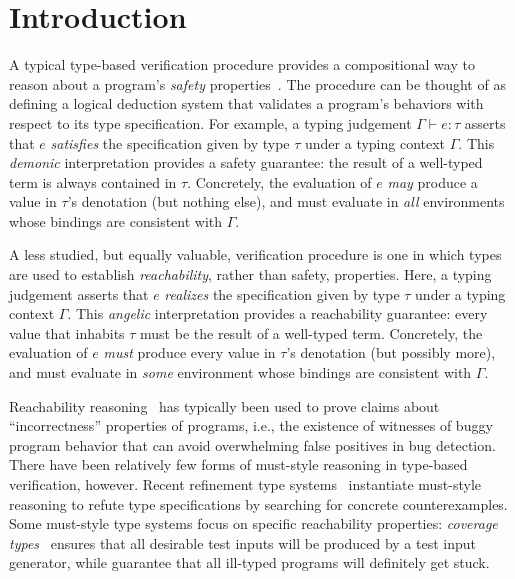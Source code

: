 \section{Introduction}\label{sec:intro}

A typical type-based verification procedure provides a compositional
way to reason about a program's \emph{safety} properties~\cite{...}.
The procedure can be thought of as defining a logical deduction system
that validates a program's behaviors with respect to its type
specification.  For example, a typing judgement $\Gamma \vdash e :
\tau$ asserts that $e$ \emph{satisfies} the specification given by type
$\tau$ under a typing context $\Gamma$.  This \emph{demonic}
interpretation provides a safety guarantee: the result of a well-typed
term is always contained in $\tau$.  Concretely, the evaluation of $e$
\emph{may} produce a value in $\tau$'s denotation (but nothing else),
and must evaluate in \emph{all} environments whose bindings are
consistent with $\Gamma$.

A less studied, but equally valuable, verification procedure is one in
which types are used to establish \emph{reachability}, rather than
safety, properties.  Here, a typing judgement asserts that $e$
\emph{realizes} the specification given by type $\tau$ under a typing
context $\Gamma$.  This \emph{angelic} interpretation provides a
reachability guarantee: every value that inhabits $\tau$ must be the
result of a well-typed term.  Concretely, the evaluation of $e$
\emph{must} produce every value in $\tau$'s denotation (but possibly
more), and must evaluate in \emph{some} environment whose bindings are
consistent with $\Gamma$.

Reachability reasoning~\cite{ReverseHoareLogic, OHP19, ZDS23} has
typically been used to prove claims about ``incorrectness'' properties
of programs, i.e., the existence of witnesses of buggy program
behavior that can avoid overwhelming false positives in bug
detection. There have been relatively few forms of must-style
reasoning in type-based verification, however. Recent refinement type
systems~\cite{RefinementTypeSymbolicExecution,RefinementTypeRefutations}
instantiate must-style reasoning to refute type specifications by
searching for concrete counterexamples.  Some must-style type systems
focus on specific reachability properties: \emph{coverage
  types}~\cite{CoverageType} ensures that all desirable test inputs
will be produced by a test input generator, while \citet{Ill-types}
guarantee that all ill-typed programs will definitely get stuck.

